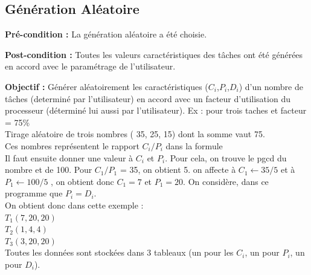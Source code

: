 	\newpage
		\subsection{Génération Aléatoire}
			\textbf{Pré-condition :} La génération aléatoire a été choisie.
		
			\textbf{Post-condition :} Toutes les valeurs caractéristiques des tâches ont été générées en accord avec le paramétrage de l’utilisateur.

			\textbf{Objectif :} Générer aléatoirement les caractéristiques ($C_i$,$P_i$,$D_i$) d’un nombre de tâches (determiné par l’utilisateur) en accord avec un facteur d’utilisation du processeur (déterminé lui aussi par l’utilisateur).
			Ex : pour trois taches et facteur = 75\% \\ 


		    Tirage aléatoire de trois nombres ( 35, 25, 15) dont la somme vaut 75. \\
		    Ces nombres représentent le rapport $C_i/P_i$ dans la formule  \\
		    Il faut ensuite donner une valeur à $C_i$ et $P_i$. Pour cela, on trouve le pgcd du nombre et de 100. Pour $C_1/P_1$ = 35, on obtient 5.  on affecte à $C_1 \leftarrow 35/5$ et à $P_1 \leftarrow 100/5$ , on obtient donc $C_1 = 7$ et $P_1 = 20$. On considère, dans ce programme que $P_i = D_i$. \\
		    
		    On obtient donc dans cette exemple :  \\
		    $T_1(7,20,20)$ \\
		    $T_2(1,4,4)$ \\
		    $T_3(3,20,20)$ \\

		    Toutes les données sont stockées dans 3 tableaux (un pour les $C_i$, un pour $P_i$, un pour $D_i$). 

